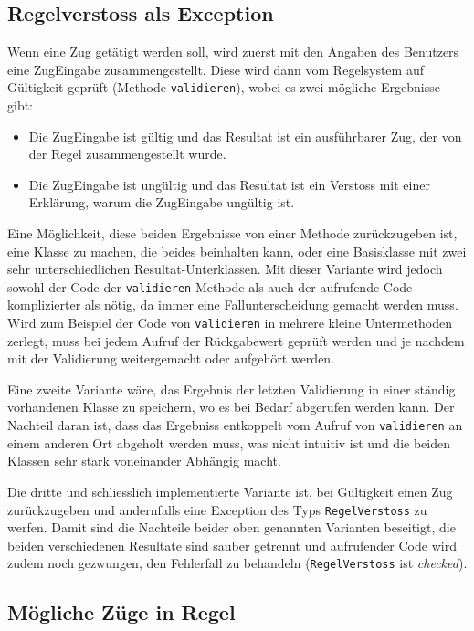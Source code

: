 \documentclass[12pt,halfparskip]{scrartcl}
\begin{document}
\subsection{Regelverstoss als Exception}

Wenn eine Zug getätigt werden soll, wird zuerst mit den Angaben des Benutzers eine ZugEingabe zusammengestellt. Diese wird dann vom Regelsystem auf Gültigkeit geprüft (Methode \texttt{validieren}), wobei es zwei mögliche Ergebnisse gibt:
\begin{itemize}
	\item Die ZugEingabe ist gültig und das Resultat ist ein ausführbarer Zug, der von der Regel zusammengestellt wurde.
	\item Die ZugEingabe ist ungültig und das Resultat ist ein Verstoss mit einer Erklärung, warum die ZugEingabe ungültig ist.
\end{itemize}

Eine Möglichkeit, diese beiden Ergebnisse von einer Methode zurückzugeben ist, eine Klasse zu machen, die beides beinhalten kann, oder eine Basisklasse mit zwei sehr unterschiedlichen Resultat-Unterklassen. Mit dieser Variante wird jedoch sowohl der Code der \texttt{validieren}-Methode als auch der aufrufende Code komplizierter als nötig, da immer eine Fallunterscheidung gemacht werden muss. Wird zum Beispiel der Code von \texttt{validieren} in mehrere kleine Untermethoden zerlegt, muss bei jedem Aufruf der Rückgabewert geprüft werden und je nachdem mit der Validierung weitergemacht oder aufgehört werden.

Eine zweite Variante wäre, das Ergebnis der letzten Validierung in einer ständig vorhandenen Klasse zu speichern, wo es bei Bedarf abgerufen werden kann. Der Nachteil daran ist, dass das Ergebniss entkoppelt vom Aufruf von \texttt{validieren} an einem anderen Ort abgeholt werden muss, was nicht intuitiv ist und die beiden Klassen sehr stark voneinander Abhängig macht.

Die dritte und schliesslich implementierte Variante ist, bei Gültigkeit einen Zug zurückzugeben und andernfalls eine Exception des Typs \texttt{RegelVerstoss} zu werfen. Damit sind die Nachteile beider oben genannten Varianten beseitigt, die beiden verschiedenen Resultate sind sauber getrennt und aufrufender Code wird zudem noch gezwungen, den Fehlerfall zu behandeln (\texttt{RegelVerstoss} ist \emph{checked}).

\subsection{Mögliche Züge in Regel}
\label{sub:moegliche_zuege_in_regel}
\end{document}
